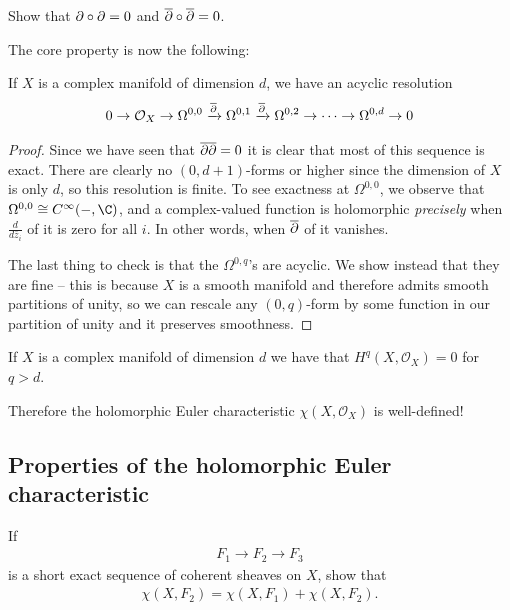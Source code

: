 \documentclass[11pt]{book}
\begin{document}
\begin{exercise} Show that $\partial \circ \partial = 0$ and $\overline{\partial} \circ \overline{\partial} =0$.
\end{exercise}

The core property is now the following:

\begin{theorem}
If $X$ is a complex manifold of dimension $d$, we have an acyclic resolution
\begin{align*}
    0 \to \mathcal{O}_X \to \Omega^{0,0} \xrightarrow{\overline{\partial}} \Omega^{0,1} \xrightarrow{\overline{\partial}} \Omega^{0,2} \to \cdots \to \Omega^{0,d} \to 0
\end{align*}
\end{theorem}
\begin{proof} Since we have seen that $\overline{\partial}\overline{\partial}=0$ it is clear that most of this sequence is exact. There are clearly no $(0,d+1)$-forms or higher since the dimension of $X$ is only $d$, so this resolution is finite. To see exactness at $\Omega^{0,0}$, we observe that $\Omega^{0,0}\cong C^\infty(-,\C)$, and a complex-valued function is holomorphic \emph{precisely} when $\frac{d}{d \bar{z}_i}$ of it is zero for all $i$. In other words, when $\overline{\partial}$ of it vanishes.

The last thing to check is that the $\Omega^{0,q}$'s are acyclic. We show instead that they are fine -- this is because $X$ is a smooth manifold and therefore admits smooth partitions of unity, so we can rescale any $(0,q)$-form by some function in our partition of unity and it preserves smoothness.
\end{proof}

\begin{corollary} 
If $X$ is a complex manifold of dimension $d$ we have that $H^q(X, \mathcal{O}_X) = 0$ for $q > d$.
\end{corollary}

Therefore the holomorphic Euler characteristic $\chi(X,\mathcal{O}_X)$ is well-defined!


\subsection{Properties of the holomorphic Euler characteristic}

\begin{exercise}\label{exer:euler-char-sheaves-additive-on-SES} 
If
\begin{align*}
    F_1 \to F_2 \to F_3
\end{align*}
is a short exact sequence of coherent sheaves on $X$, show that
\begin{align*}
    \chi(X,F_2) = \chi(X,F_1) + \chi(X,F_2).
\end{align*}
\end{exercise}
\end{document}
